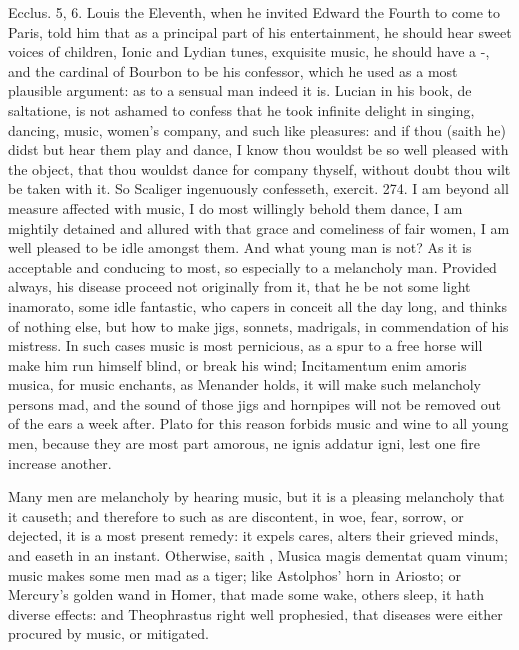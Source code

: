 {Ecclus.  5, 6. Louis the Eleventh, when he invited Edward
the Fourth to come to Paris, told him that as a principal part of his
entertainment, he should hear sweet voices of children, Ionic and
Lydian tunes, exquisite music, he should have a -, and the cardinal of
Bourbon to be his confessor, which he used as a most plausible
argument: as to a sensual man indeed it is.  Lucian in his book,
de saltatione, is not ashamed to confess that he took infinite delight
in singing, dancing, music, women's company, and such like pleasures:
and if thou (saith he) didst but hear them play and dance, I know thou
wouldst be so well pleased with the object, that thou wouldst dance for
company thyself, without doubt thou wilt be taken with it. So Scaliger
ingenuously confesseth, exercit. 274. I am beyond all measure
affected with music, I do most willingly behold them dance, I am
mightily detained and allured with that grace and comeliness of fair
women, I am well pleased to be idle amongst them. And what young man is
not? As it is acceptable and conducing to most, so especially to a
melancholy man. Provided always, his disease proceed not originally
from it, that he be not some light inamorato, some idle fantastic, who
capers in conceit all the day long, and thinks of nothing else, but how
to make jigs, sonnets, madrigals, in commendation of his mistress. In
such cases music is most pernicious, as a spur to a free horse will
make him run himself blind, or break his wind; Incitamentum enim amoris
musica, for music enchants, as Menander holds, it will make such
melancholy persons mad, and the sound of those jigs and hornpipes will
not be removed out of the ears a week after. Plato for this
reason forbids music and wine to all young men, because they are most
part amorous, ne ignis addatur igni, lest one fire increase another.

Many men are melancholy by hearing music, but it is a pleasing
melancholy that it causeth; and therefore to such as are discontent, in
woe, fear, sorrow, or dejected, it is a most present remedy: it expels
cares, alters their grieved minds, and easeth in an instant. Otherwise,
saith \Plutarch, Musica magis dementat quam vinum; music makes
some men mad as a tiger; like Astolphos' horn in Ariosto; or Mercury's
golden wand in Homer, that made some wake, others sleep, it hath diverse
effects: and Theophrastus right well prophesied, that diseases
were either procured by music, or mitigated.

}
